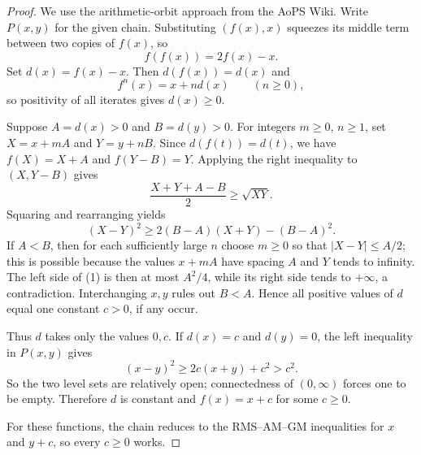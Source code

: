 
\begin{dlsummary}[title={\bfseries Solution 21. 2026 IMO Problem 5},breakable]

\begin{proof}
We use the arithmetic-orbit approach from the AoPS Wiki.
Write $P(x,y)$ for the given chain. Substituting $(f(x),x)$ squeezes
its middle term between two copies of $f(x)$, so
\[
f(f(x))=2f(x)-x.
\]
Set $d(x)=f(x)-x$. Then $d(f(x))=d(x)$ and
\[
f^n(x)=x+nd(x)\qquad(n\geq0),
\]
so positivity of all iterates gives $d(x)\geq0$.

Suppose $A=d(x)>0$ and $B=d(y)>0$. For integers $m\geq0$, $n\geq1$,
set $X=x+mA$ and $Y=y+nB$. Since $d(f(t))=d(t)$, we have
$f(X)=X+A$ and $f(Y-B)=Y$. Applying the right inequality to
$(X,Y-B)$ gives
\[
\frac{X+Y+A-B}{2}\geq\sqrt{XY}.
\]
Squaring and rearranging yields
\[
(X-Y)^2\geq2(B-A)(X+Y)-(B-A)^2. \tag{1}
\]
If $A<B$, then for each sufficiently large $n$ choose $m\geq0$ so
that $|X-Y|\leq A/2$; this is possible because the values $x+mA$ have
spacing $A$ and $Y$ tends to infinity. The left side of (1) is then at
most $A^2/4$, while its right side tends to $+\infty$, a contradiction.
Interchanging $x,y$ rules out $B<A$. Hence all positive values of $d$
equal one constant $c>0$, if any occur.

Thus $d$ takes only the values $0,c$. If $d(x)=c$ and $d(y)=0$, the
left inequality in $P(x,y)$ gives
\[
(x-y)^2\geq2c(x+y)+c^2>c^2.
\]
So the two level sets are relatively open; connectedness of
$(0,\infty)$ forces one to be empty. Therefore $d$ is constant and
$f(x)=x+c$ for some $c\geq0$.

For these functions, the chain reduces to the RMS--AM--GM inequalities
for $x$ and $y+c$, so every $c\geq0$ works.
\end{proof}

\end{dlsummary}